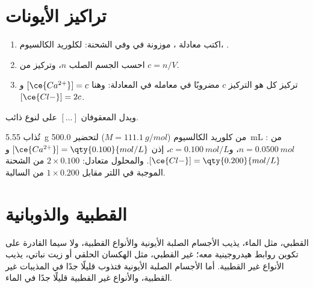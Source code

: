 \section{تراكيز الأيونات}

\begin{method}\label{met:g11:dissolution:ions}
\begin{enumerate}
  \item اكتب معادلة ، موزونة في  وفي الشحنة:
        لكلوريد الكالسيوم، .
  \item احسب  الجسم الصلب  $n$، وتركيز 
        من  $c = n / V$.
  \item تركيز كل  هو التركيز $c$ مضروبًا في معامله
        في المعادلة: وهنا $[\ce{Ca^{2+}}] = c$
        و$[\ce{Cl-}] = 2c$.
\end{enumerate}
ويدل المعقوفان $[\ldots]$ على  لنوع
ذائب.
\end{method}

\begin{example}\label{ex:g11:dissolution:cacl2}
تُذاب \qty{5.55}{g} من كلوريد الكالسيوم ($M = \qty{111.1}{g/mol}$)
لتحضير \qty{500.0}{mL} من : $n = \qty{0.0500}{mol}$،
و$c = \qty{0.100}{mol/L}$، إذن $[\ce{Ca^{2+}}] = \qty{0.100}{mol/L}$
و$[\ce{Cl-}] = \qty{0.200}{mol/L}$. والمحلول متعادل: $2 \times
0.100$ من الشحنة الموجبة في اللتر مقابل $1 \times 0.200$ من السالبة.
\end{example}

\section{القطبية والذوبانية}

\begin{proposition}\label{prop:g11:dissolution:like}
 القطبي، مثل الماء، يذيب الأجسام الصلبة الأيونية والأنواع القطبية، ولا
سيما القادرة على تكوين روابط هيدروجينية معه؛  غير القطبي، مثل الهكسان
الحلقي أو زيت نباتي، يذيب الأنواع غير القطبية. أما الأجسام الصلبة الأيونية
فتذوب قليلًا جدًا في المذيبات غير القطبية، والأنواع غير القطبية قليلًا جدًا في
الماء.
\end{proposition}

